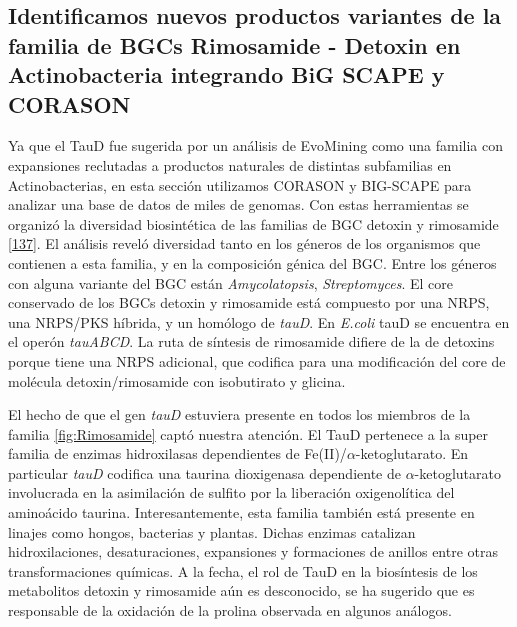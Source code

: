 \documentclass[12pt,twoside]{reedthesis}
\begin{document}
  \subsection{Identificamos nuevos productos variantes de la familia de
  BGCs Rimosamide - Detoxin en Actinobacteria integrando BiG SCAPE y
  CORASON}\label{identificamos-nuevos-productos-variantes-de-la-familia-de-bgcs-rimosamide---detoxin-en-actinobacteria-integrando-big-scape-y-corason}
  
  Ya que el TauD fue sugerida por un análisis de EvoMining como una
  familia con expansiones reclutadas a productos naturales de distintas
  subfamilias en Actinobacterias, en esta sección utilizamos CORASON y
  BIG-SCAPE para analizar una base de datos de miles de genomas. Con estas
  herramientas se organizó la diversidad biosintética de las familias de
  BGC detoxin y rimosamide
  {[}\protect\hyperlink{ref-mcclure_elucidating_2016}{137}{]}. El análisis
  reveló diversidad tanto en los géneros de los organismos que contienen a
  esta familia, y en la composición génica del BGC. Entre los géneros con
  alguna variante del BGC están \emph{Amycolatopsis}, \emph{Streptomyces}.
  El core conservado de los BGCs detoxin y rimosamide está compuesto por
  una NRPS, una NRPS/PKS híbrida, y un homólogo de \emph{tauD}. En
  \emph{E.coli} tauD se encuentra en el operón \emph{tauABCD}. La ruta de
  síntesis de rimosamide difiere de la de detoxins porque tiene una NRPS
  adicional, que codifica para una modificación del core de molécula
  detoxin/rimosamide con isobutirato y glicina.
  
  El hecho de que el gen \emph{tauD} estuviera presente en todos los
  miembros de la familia \autoref{fig:Rimosamide} captó nuestra atención.
  El TauD pertenece a la super familia de enzimas hidroxilasas
  dependientes de Fe(II)/\(\alpha\)-ketoglutarato. En particular
  \emph{tauD} codifica una taurina dioxigenasa dependiente de
  \(\alpha\)-ketoglutarato involucrada en la asimilación de sulfito por la
  liberación oxigenolítica del aminoácido taurina. Interesantemente, esta
  familia también está presente en linajes como hongos, bacterias y
  plantas. Dichas enzimas catalizan hidroxilaciones, desaturaciones,
  expansiones y formaciones de anillos entre otras transformaciones
  químicas. A la fecha, el rol de TauD en la biosíntesis de los
  metabolitos detoxin y rimosamide aún es desconocido, se ha sugerido que
  es responsable de la oxidación de la prolina observada en algunos
  análogos.
  
\end{document}
